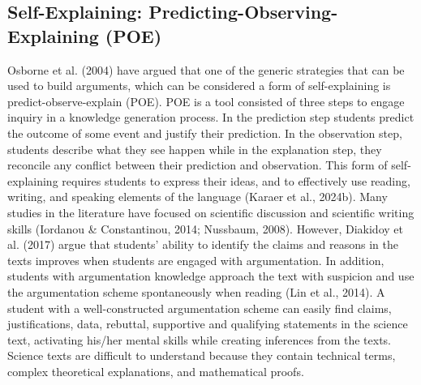 \documentclass[11.5pt]{sig-alternate} %
\begin{document}
\begin{large}
\subsection*{Self-Explaining: Predicting-Observing-Explain\-ing (POE)}
Osborne et al. (2004) have argued that one of the generic strategies that can be used to build arguments, which can be considered a form of self-explaining is predict-observe-explain (POE). POE is a tool consisted of three steps to engage inquiry in a knowledge generation process. In the prediction step students predict the outcome of some event and justify their prediction. In the observation step, students describe what they see happen while in the explanation step, they reconcile any conflict between their prediction and observation. This form of self-explaining requires students to express their ideas, and to effectively use reading, writing, and speaking elements of the language (Karaer et al., 2024b). Many studies in the literature have focused on scientific discussion and scientific writing skills (Iordanou \& Constantinou, 2014; Nussbaum, 2008). However, Diakidoy et al. (2017) argue that students' ability to identify the claims and reasons in the texts improves when students are engaged with argumentation. In addition, students with argumentation knowledge approach the text with suspicion and use the argumentation scheme spontaneously when reading (Lin et al., 2014). A student with a well-constructed argumentation scheme can easily find claims, justifications, data, rebuttal, supportive and qualifying statements in the science text, activating his/her mental skills while creating inferences from the texts. Science texts are difficult to understand because they contain technical terms, complex theoretical explanations, and mathematical proofs. 


\end{large}
\end{document}
